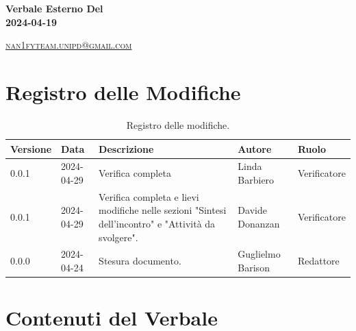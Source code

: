 \documentclass[8pt]{article}
\begin{document}
\begin{titlepage}
\begin{minipage}[t]{0.47\textwidth}
{		}
		\vspace{4mm}\vspace{4mm}
	\end{minipage}
	\vspace{4cm}
	\begin{center}
		\begin{flushright}
			{\fontsize{30pt}{52pt}\selectfont \textbf{Verbale Esterno Del\\2024-04-19\\}} %
		\end{flushright}
		\vspace{3cm}
	\end{center}
	\vspace{8.5 cm}
	{\small \textsc{\href{mailto: nan1fyteam.unipd@gmail.com}{nan1fyteam.unipd@gmail.com}}}
\end{titlepage}
\pagestyle{mystyle}
\section*{Registro delle Modifiche}
\begin{table}[ht!]	
	\centering
	\begin{tabular}{p{1.2cm} p{2cm} p{6cm} p{3cm} p{2cm}}
		\toprule
		\textbf{Versione}& \textbf{Data} & \textbf{Descrizione} & \textbf{Autore} & \textbf{Ruolo} \\
		\midrule
		0.0.1 & 2024-04-29 & Verifica completa & Linda Barbiero & Verificatore \\
		0.0.1 & 2024-04-29 & Verifica completa e lievi modifiche nelle sezioni "Sintesi dell'incontro" e "Attività da svolgere".  & Davide Donanzan & Verificatore \\
		0.0.0 & 2024-04-24 & Stesura documento.  & Guglielmo Barison & Redattore \\
		\bottomrule
	\end{tabular}
	\caption{Registro delle modifiche.}
	\label{table:Registro delle modifiche}
\end{table}
\newpage
\tableofcontents
\clearpage
\newpage
\justifying
\section{Contenuti del Verbale}
\end{document}
